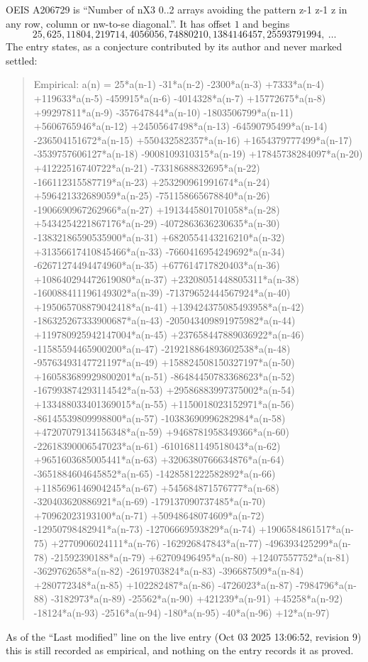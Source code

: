 \documentclass[11pt,a4paper]{article}
\theoremstyle{plain}
\theoremstyle{definition}
\begin{document}
OEIS A206729 is ``Number of nX3 0..2 arrays avoiding the pattern z-1 z-1 z in any row, column or nw-to-se diagonal.''. It has offset $1$ and begins
\[
25, 625, 11804, 219714, 4056056, 74880210, 1384146457, 25593791994,\ \dots
\]
The entry states, as a conjecture contributed by its author and never marked settled:
\begin{quote}
Empirical: a(n) = 25*a(n-1) -31*a(n-2) -2300*a(n-3) +7333*a(n-4) +119633*a(n-5) -459915*a(n-6) -4014328*a(n-7) +15772675*a(n-8) +99297811*a(n-9) -357647844*a(n-10) -1803506799*a(n-11) +5606765946*a(n-12) +24505647498*a(n-13) -64590795499*a(n-14) -236504151672*a(n-15) +550432582357*a(n-16) +1654379777499*a(n-17) -3539757606127*a(n-18) -9008109310315*a(n-19) +17845738284097*a(n-20) +41222516740722*a(n-21) -73318688832695*a(n-22) -166112315587719*a(n-23) +253290961991674*a(n-24) +596421332689059*a(n-25) -751158665678840*a(n-26) -1906690967262966*a(n-27) +1913445801701058*a(n-28) +5434254221867176*a(n-29) -4072863636230635*a(n-30) -13832186590535900*a(n-31) +6820554143216210*a(n-32) +31356617410845466*a(n-33) -7660416954249692*a(n-34) -62671274494474960*a(n-35) +677614717820403*a(n-36) +108640294472619080*a(n-37) +23208051448805311*a(n-38) -160088411196149302*a(n-39) -71379652444567924*a(n-40) +195065708879042418*a(n-41) +139424375085493958*a(n-42) -186325267333900687*a(n-43) -205043409891975982*a(n-44) +119780925942147004*a(n-45) +237658447889036922*a(n-46) -11585594465900200*a(n-47) -219218864893602538*a(n-48) -95763493147721197*a(n-49) +158824508150327197*a(n-50) +160583689929800201*a(n-51) -86484450783368623*a(n-52) -167993874293114542*a(n-53) +29586883997375002*a(n-54) +133488033401369015*a(n-55) +1150018023152971*a(n-56) -86145539809998800*a(n-57) -10383690996282984*a(n-58) +47207079134156348*a(n-59) +9468781958349366*a(n-60) -22618390006547023*a(n-61) -6101681149518043*a(n-62) +9651603685005441*a(n-63) +3206380766634876*a(n-64) -3651884604645852*a(n-65) -1428581222582892*a(n-66) +1185696146904245*a(n-67) +545684871576777*a(n-68) -320403620886921*a(n-69) -179137090737485*a(n-70) +70962023193100*a(n-71) +50948648074609*a(n-72) -12950798482941*a(n-73) -12706669593829*a(n-74) +1906584861517*a(n-75) +2770906024111*a(n-76) -162926847843*a(n-77) -496393425299*a(n-78) -21592390188*a(n-79) +62709496495*a(n-80) +12407557752*a(n-81) -3629762658*a(n-82) -2619703824*a(n-83) -396687509*a(n-84) +280772348*a(n-85) +102282487*a(n-86) -4726023*a(n-87) -7984796*a(n-88) -3182973*a(n-89) -25562*a(n-90) +421239*a(n-91) +45258*a(n-92) -18124*a(n-93) -2516*a(n-94) -180*a(n-95) -40*a(n-96) +12*a(n-97)
\end{quote}
As of the ``Last modified'' line on the live entry (Oct 03 2025 13:06:52, revision 9) this is still
recorded as empirical, and nothing on the entry records it as proved.
\end{document}
